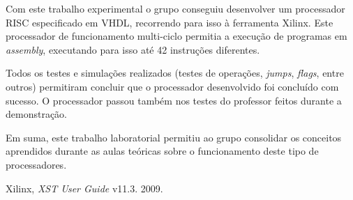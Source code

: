 \documentclass[a4paper]{article}
\begin{document}
		Com este trabalho experimental o grupo conseguiu desenvolver um processador \textmu RISC especificado em VHDL, recorrendo para isso à ferramenta Xilinx. Este processador de funcionamento multi-ciclo permitia a execução de programas em \textit{assembly}, executando para isso até 42 instruções diferentes.
		
		Todos os testes e simulações realizados (testes de operações, \textit{jumps}, \textit{flags}, entre outros) permitiram concluir que o processador desenvolvido foi concluído com sucesso. O processador passou também nos testes do professor feitos durante a demonstração.
		
		Em suma, este trabalho laboratorial permitiu ao grupo consolidar os conceitos aprendidos durante as aulas teóricas sobre o funcionamento deste tipo de processadores.


	
	
	\vspace{3cm}
	\begin{thebibliography}{13}
		Xilinx\textregistered,
		\emph{XST User Guide} v11.3.
		2009.
	\end{thebibliography}
\end{document}
